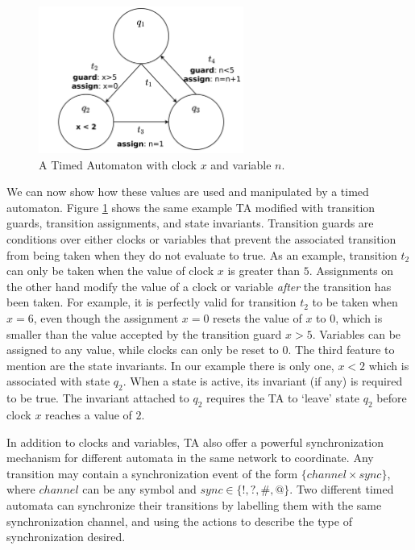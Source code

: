 \documentclass[a4paper,12pt]{article}
\begin{document}
\begin{figure}[h]
  \centering
  \includegraphics[width=0.6\textwidth]{minTA-big}
  \caption{A Timed Automaton with clock $x$ and variable $n$.}
  \label{fig:example-big}
\end{figure}

We can now show how these values are used and manipulated by a timed automaton.
Figure \ref{fig:example-big} shows the same example TA modified with transition
guards, transition assignments, and state invariants. Transition guards are
conditions over either clocks or variables that prevent the associated
transition from being taken when they do not evaluate to true. As an example,
transition $t_{2}$ can only be taken when the value of clock $x$ is greater than
$5$. Assignments on the other hand modify the value of a clock or variable
\emph{after} the transition has been taken. For example, it is perfectly valid
for transition $t_{2}$ to be taken when $x=6$, even though the assignment
$x=0$ resets the value of $x$ to $0$, which is smaller than the value
accepted by the transition guard $x>5$. Variables can be assigned to any value,
while clocks can only be reset to $0$. The third feature to mention are the
state invariants. In our example there is only one, $x<2$ which is associated
with state $q_{2}$. When a state is active, its invariant (if any) is required
to be true. The invariant attached to $q_{2}$ requires the TA to `leave' state
$q_{2}$ before clock $x$ reaches a value of $2$.


In addition to clocks and variables, TA also offer a powerful synchronization
mechanism for different automata in the same network to coordinate. Any
transition may contain a synchronization event of the form
$\{channel \times sync\}$, where $channel$ can be any symbol and
$sync \in \{!,?,\#,@\}$. Two different timed automata can synchronize their
transitions by labelling them with the same synchronization channel, and using
the actions to describe the type of synchronization desired.
\end{document}
